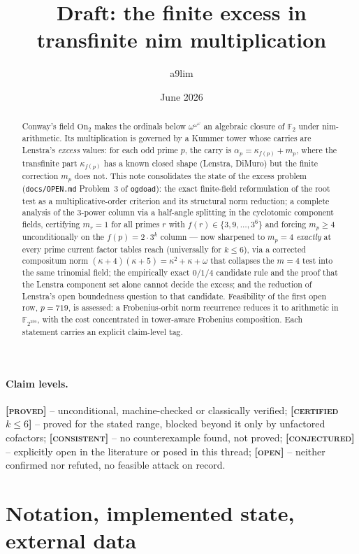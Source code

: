 \documentclass[11pt]{article}
\title{Draft: the finite excess in transfinite nim multiplication}
\author{a9lim}
\date{June 2026}
\theoremstyle{plain}
\theoremstyle{definition}
\newcommand{\F}{\mathbb{F}}
\newcommand{\PROVED}{\textbf{[\textsc{proved}]}}
\newcommand{\CERTIFIED}[1]{\textbf{[\textsc{certified} $#1$]}}
\newcommand{\CONSISTENT}{\textbf{[\textsc{consistent}]}}
\newcommand{\CONJECTURED}{\textbf{[\textsc{conjectured}]}}
\newcommand{\OPEN}{\textbf{[\textsc{open}]}}
\begin{document}
\maketitle

\begin{abstract}
Conway's field $\mathrm{On}_2$ makes the ordinals below
$\omega^{\omega^{\omega}}$ an algebraic closure of $\F_2$ under
nim-arithmetic. Its multiplication is governed by a Kummer tower whose
carries are Lenstra's \emph{excess} values: for each odd prime $p$, the
carry is $\alpha_p=\kappa_{f(p)}+m_p$, where the transfinite part
$\kappa_{f(p)}$ has a known closed shape (Lenstra, DiMuro) but the finite
correction $m_p$ does not. This note consolidates the state of the excess
problem (\texttt{docs/OPEN.md} Problem~3 of \texttt{ogdoad}): the exact
finite-field reformulation of the root test as a multiplicative-order
criterion and its structural norm reduction; a complete analysis of the
$3$-power column via a half-angle splitting in the cyclotomic component
fields, certifying $m_r=1$ for all primes $r$ with
$f(r)\in\{3,9,\dots,3^6\}$ and forcing $m_p\geq4$ unconditionally on the
$f(p)=2\cdot3^k$ column --- now sharpened to $m_p=4$ \emph{exactly} at
every prime current factor tables reach (universally for $k\leq6$), via
a corrected compositum norm
$(\kappa+4)(\kappa+5)=\kappa^2+\kappa+\omega$ that collapses the $m=4$
test into the same trinomial field; the empirically exact $0/1/4$
candidate rule and the proof that the Lenstra component set alone cannot
decide the excess; and the reduction of Lenstra's open boundedness
question to that candidate.
Feasibility of the first open row, $p=719$, is assessed: a
Frobenius-orbit norm recurrence reduces it to arithmetic in
$\F_{2^{359}}$, with the cost concentrated in tower-aware Frobenius
composition. Each statement carries an explicit claim-level tag.
\end{abstract}

\paragraph{Claim levels.}
\PROVED{} -- unconditional, machine-checked or classically verified;
\CERTIFIED{k\leq6} -- proved for the stated range, blocked beyond it only
by unfactored cofactors; \CONSISTENT{} -- no counterexample found, not
proved; \CONJECTURED{} -- explicitly open in the literature or posed in
this thread; \OPEN{} -- neither confirmed nor refuted, no feasible attack
on record.

\section{Notation, implemented state, external data}\label{sec:notation}
\end{document}
